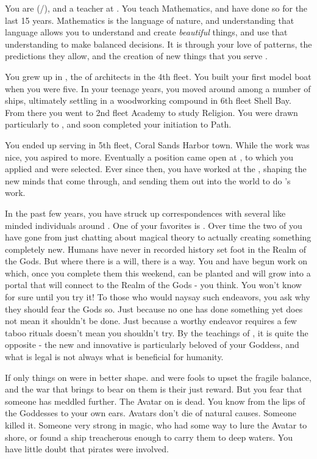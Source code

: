 \documentclass[char]{GL2020}
\begin{document}
\name{\cFlowPriest{}}

You are \cFlowPriest{\full} (\cFlowPriest{\they}/\cFlowPriest{\them}), and a teacher at \pSchool{}. You teach Mathematics, and have done so for the last 15 years. Mathematics is the language of nature, and understanding that language allows you to understand and create \emph{beautiful} things, and use that understanding to make balanced decisions. It is through your love of patterns, the predictions they allow, and the creation of new things that you serve \cFlow{\full}.

You grew up in \pShip{}, the \cFlowPriest{\child} of architects in the 4th fleet. You built your first model boat when you were five. In your teenage years, you moved around among a number of ships, ultimately settling in a woodworking compound in 6th fleet Shell Bay. From there you went to 2nd fleet Academy to study Religion. You were drawn particularly to \cFlow{}, and soon completed your initiation to \cFlow{\their} Path. 

You ended up serving in 5th fleet, Coral Sands Harbor town. While the work was nice, you aspired to more. Eventually a position came open at \pSchool{}, to which you applied and were selected. Ever since then, you have worked at the \pSc{}, shaping the new minds that come through, and sending them out into the world to do \cFlow{}’s work.

In the past few years, you have struck up correspondences with several like minded individuals around \pEarth{}. One of your favorites is \cCurse{}. Over time the two of you have gone from just chatting about magical theory to actually creating something completely new. Humans have never in recorded history set foot in the Realm of the Gods. But where there is a will, there is a way. You and \cCurse{} have begun work on \iBeansMB{} which, once you complete them this weekend, can be planted and will grow into a portal that will connect \pEarth{} to the Realm of the Gods - you think. You won’t know for sure until you try it! To those who would naysay such endeavors, you ask why they should fear the Gods so. Just because no one has done something yet does not mean it shouldn’t be done. Just because a worthy endeavor requires a few taboo rituals doesn’t mean you shouldn’t try. By the teachings of \cFlow{}, it is quite the opposite - the new and innovative is particularly beloved of your Goddess, and what is legal is not always what is beneficial for humanity.

If only things on \pEarth{} were in better shape. \pFarm{} and \pTech{} were fools to upset the fragile balance, and the war that \cLoud{\full} brings to bear on them is their just reward. But you fear that someone has meddled further. The \cEbb{} Avatar on \pEarth{} is dead. You know from the lips of the Goddesses to your own ears. Avatars don’t die of natural causes. Someone killed it. Someone very strong in magic, who had some way to lure the Avatar to shore, or found a ship treacherous enough to carry them to deep waters. You have little doubt that pirates were involved.
\end{document}
